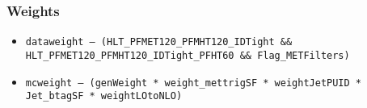 \documentclass{beamer}
\begin{document}
\begin{frame}
  \frametitle{Weights}

  \begin{itemize}
  \item \texttt{\scriptsize dataweight -- (HLT\_PFMET120\_PFMHT120\_IDTight \&\& HLT\_PFMET120\_PFMHT120\_IDTight\_PFHT60 \&\& Flag\_METFilters)}
  \item \texttt{\scriptsize mcweight -- (genWeight * weight\_mettrigSF * weightJetPUID * Jet\_btagSF * weightLOtoNLO)}
  \end{itemize}

\end{frame}
\end{document}
